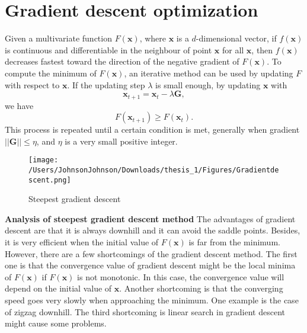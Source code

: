 \section{Gradient descent optimization}
 Given a multivariate function $F(\bm{x})$, where $\bm{x}$ is a $d$-dimensional vector, if $f(\bm{x})$ is continuous and differentiable in the neighbour of point $\bm{x}$ for all $\bm{x}$, then $f(\bm{x})$ decreases fastest toward the direction of the negative gradient of $F(\bm{x})$. To compute the minimum of $F(\bm{x})$, an iterative method can be used by updating $F$ with respect to $\bm{x}$. If the updating step $\lambda$ is small enough, by updating $\bm{x}$ with 
 \begin{equation}
 \bm{x}_{t+1} = \bm{x}_{t} - \lambda \bm{G},
 \end{equation}
we have 
  \begin{equation}
 F(\bm{x}_{t+1}) \ge F(\bm{x}_t).
  \end{equation}
This process is repeated until a certain condition is met, generally when gradient $||\bm{G}|| \le \eta$, and $\eta$ is a very small positive integer. 
\begin{figure}
\centering
\texttt{[image: /Users/JohnsonJohnson/Downloads/thesis\_1/Figures/Gradientdescent.png]}
\caption{Steepest gradient descent}
\vspace{0em}
\end{figure} 

\textbf{Analysis of steepest gradient descent method} The advantages of gradient descent are that it is always downhill and it can avoid the saddle points. Besides, it is very efficient when the initial value of $F(\bm{x})$ is far from the minimum. However, there are a few shortcomings of the gradient descent method. The first one is that the convergence value of gradient descent might be the local minima of $F(\bm{x})$ if $F(\bm{x})$ is not monotonic. In this case, the convergence value will depend on the initial value of $\bm{x}$. Another shortcoming is that the converging speed goes very slowly when approaching the minimum. One example is the case of zigzag downhill. The third shortcoming is linear search in gradient descent might cause some problems.

